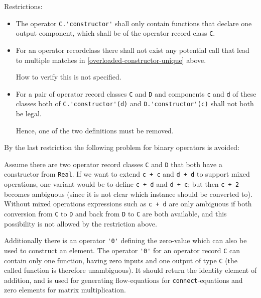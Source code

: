 Restrictions:
\begin{itemize}
\item
  The operator \lstinline!C.'constructor'! shall only contain functions that declare one output component, which shall be of the operator record class \lstinline!C!.
\item
  For an operator recordclass there shall not exist any potential call that lead to multiple matches in \cref{overloaded-constructor-unique} above.
  \begin{nonnormative}
  How to verify this is not specified.
  \end{nonnormative}
\item
  For a pair of operator record classes \lstinline!C! and \lstinline!D! and components \lstinline!c! and \lstinline!d! of these classes both of \lstinline!C.'constructor'(d)! and \lstinline!D.'constructor'(c)! shall not both be legal.
  \begin{nonnormative}
   Hence, one of the two definitions must be removed.
  \end{nonnormative}
\end{itemize}

\begin{nonnormative}
By the last restriction the following problem for binary operators is avoided:

Assume there are two operator record classes \lstinline!C! and \lstinline!D! that both have a constructor from \lstinline!Real!.  If we want to extend \lstinline!c + c! and \lstinline!d + d! to support mixed operations, one variant would be to define \lstinline!c + d! and \lstinline!d + c!; but then \lstinline!c + 2! becomes ambiguous (since it is not clear which instance should be converted to).  Without mixed operations expressions such as \lstinline!c + d! are only ambiguous if both conversion from \lstinline!C! to \lstinline!D! and back from \lstinline!D! to \lstinline!C! are both available, and this possibility is not allowed by the restriction above.
\end{nonnormative}

Additionally there is an operator \lstinline!'0'! defining the zero-value which can also be used to construct an element.  The operator \lstinline!'0'! for an operator record \lstinline!C! can
contain only one function, having zero inputs and one output of type \lstinline!C! (the called function is therefore unambiguous).  It should return the identity element of addition, and is used for
generating flow-equations for \lstinline!connect!-equations and zero elements for matrix multiplication.

